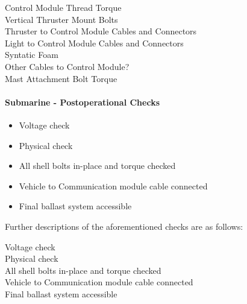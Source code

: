 \documentclass[
10pt, %
a4paper, %
oneside, %
headinclude,footinclude, %
BCOR5mm, %
]{scrartcl}
\begin{document}
\begin{description}
	\item[Control Module Thread Torque] \lipsum[7] %
	\item[Vertical Thruster Mount Bolts] \lipsum[7] %
	\item[Thruster to Control Module Cables and Connectors] \lipsum[7] %
	\item[Light to Control Module Cables and Connectors] \lipsum[7] %
	\item[Syntatic Foam] \lipsum[7] %
	\item[Other Cables to Control Module?] \lipsum[7] %
	\item[Mast Attachment Bolt Torque] \lipsum[7] %
\end{description}

\paragraph{Submarine - Postoperational Checks} \lipsum[7] %

\begin{itemize}[noitemsep] %
	\item Voltage check
	\item Physical check
	\item All shell bolts in-place and torque checked
	\item Vehicle to Communication module cable connected
	\item Final ballast system accessible
\end{itemize}

Further descriptions of the aforementioned checks are as follows:

\begin{description}
	\item[Voltage check] \lipsum[7] %
	\item[Physical check] \lipsum[7] %
	\item[All shell bolts in-place and torque checked] \lipsum[7] %
	\item[Vehicle to Communication module cable connected] \lipsum[7] %
	\item[Final ballast system accessible] \lipsum[7] %
\end{description}
\end{document}
